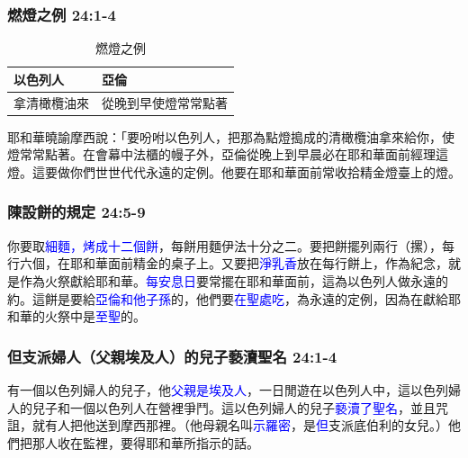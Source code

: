 \subsubsection{燃燈之例 24:1-4} 
\begin{table}
\vspace*{-2mm}
\centering
\begin{tabular}{l|l}
\toprule
以色列人 &  亞倫 \\\hline
拿清橄欖油來&從晚到早使燈常常點著\tabularnewline\hline
\bottomrule
\end{tabular}
\caption{燃燈之例}
\end{table} 
耶和華曉諭摩西說：「要吩咐以色列人，把那為點燈搗成的清橄欖油拿來給你，使燈常常點著。在會幕中法櫃的幔子外，亞倫從晚上到早晨必在耶和華面前經理這燈。這要做你們世世代代永遠的定例。他要在耶和華面前常收拾精金燈臺上的燈。

\subsubsection{陳設餅的規定 24:5-9} 
你要取\textcolor{blue}{細麵，烤成十二個餅}，每餅用麵伊法十分之二。要把餅擺列兩行（摞），每行六個，在耶和華面前精金的桌子上。又要把\textcolor{blue}{淨乳香}放在每行餅上，作為紀念，就是作為火祭獻給耶和華。\textcolor{blue}{每安息日}要常擺在耶和華面前，這為以色列人做永遠的約。這餅是要給\textcolor{blue}{亞倫和他子孫}的，他們要\textcolor{blue}{在聖處吃}，為永遠的定例，因為在獻給耶和華的火祭中是\textcolor{blue}{至聖}的。

\subsubsection{但支派婦人（父親埃及人）的兒子褻瀆聖名 24:1-4} 
有一個以色列婦人的兒子，他\textcolor{blue}{父親是埃及人}，一日閒遊在以色列人中，這以色列婦人的兒子和一個以色列人在營裡爭鬥。這以色列婦人的兒子\textcolor{blue}{褻瀆了聖名}，並且咒詛，就有人把他送到摩西那裡。（他母親名叫\textcolor{blue}{示羅密}，是\textcolor{blue}{但}支派底伯利的女兒。）他們把那人收在監裡，要得耶和華所指示的話。

